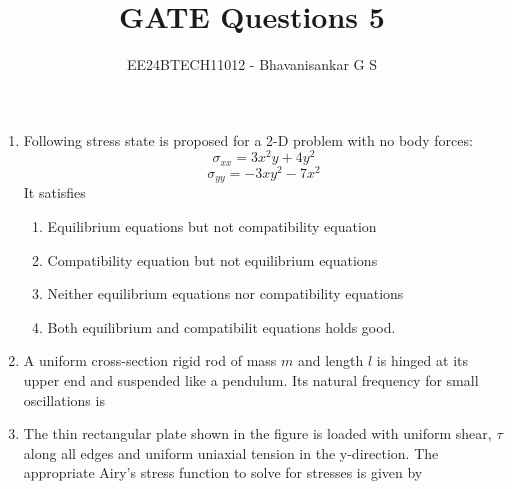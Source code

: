 \documentclass[journal,12pt,onecolumn]{IEEEtran}
\theoremstyle{remark}
\begin{document}

\vspace{3cm}

\title{GATE Questions 5}
\author{EE24BTECH11012 - Bhavanisankar G S}
\maketitle
\newpage
\bigskip

\renewcommand{\thefigure}{\theenumi}
\renewcommand{\thetable}{\theenumi}
\begin{enumerate}
	\item Following stress state is proposed for a 2-D problem with no body forces:
		$$ \sigma_{xx} = 3x^2y + 4y^2 $$
		$$ \sigma_{yy} = -3xy^2 - 7x^2 $$
		It satisfies
		\begin{enumerate}
			\item Equilibrium equations but not compatibility equation
			\item Compatibility equation but not equilibrium equations
			\item Neither equilibrium equations nor compatibility equations
			\item Both equilibrium and compatibilit equations holds good.
		\end{enumerate}
	\item A uniform cross-section rigid rod of mass $m$ and length $l$ is hinged at its upper end and suspended like a pendulum. Its natural frequency for small oscillations is
		\begin{figure}[H]
			\centering
			
			\caption{}
			\label{25}
		\end{figure}
		\begin{enumerate}
		\end{enumerate}
	\item The thin rectangular plate shown in the figure is loaded with uniform shear, $\tau$ along all edges and uniform uniaxial tension in the y-direction. The appropriate Airy's stress function to solve for stresses is given by
		\begin{figure}[H]
			\centering
			
			\caption{}

\end{figure}
\end{enumerate}
\end{document}
